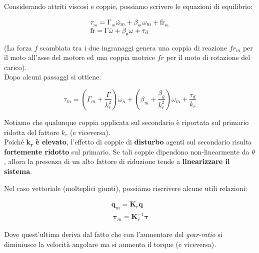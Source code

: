 Considerando attriti viscosi e coppie, possiamo scrivere le equazioni di equilibrio:

$$
\begin{array}{l c r}
	{\tau_{_\mathrm{m}}=\Gamma_{_\mathrm{m}}\dot{\omega}_{\mathrm{m}}+\beta_{_\mathrm{m}}\omega_{\mathrm{m}}+\mathrm{fr}_{_{\mathrm{m}}}}\\ {\mathrm{fr}=\Gamma\dot{\omega}+\beta_{_\mathrm{g}}\omega+\tau_{\mathrm{d}}}
\end{array}
$$

(La forza $f$ scambiata tra i due ingranaggi genera una coppia di reazione $fr_m$ per il moto all'asse del motore ed una coppia motrice $fr$ per il moto di rotazione del carico).\\
Dopo alcuni passaggi si ottiene:

$$
\tau_m = \left( \Gamma_m + \frac{\Gamma}{k_r^2} \right) \dot{\omega}_n
+
\left( \beta_m + \frac{\beta_g}{k_r^2} \right)\omega_m
+
\frac{\tau_d}{k_r}
$$

Notiamo che qualunque coppia applicata sul secondario è riportata sul primario ridotta del fattore $k_r$ (e viceversa). \\
Poiché $\mathbf{k_r}$ \textbf{è elevato}, l’effetto di coppie di \textbf{disturbo} agenti sul secondario risulta \textbf{fortemente ridotto} sul primario. Se tali coppie dipendono non-linearmente da $\theta$, allora la presenza di un alto fattore di riduzione tende a \textbf{linearizzare il sistema}.

Nel caso vettoriale (molteplici giunti), possiamo riscrivere alcune utili relazioni:

\begin{align}
	\mathbf{q}_m = \mathbf{K}_r\mathbf{q} \label{eq:trasmission_reduction}\\\
	\boldsymbol{\tau}_m = \mathbf{K}_r^{-1} \boldsymbol{\tau} \label{eq:trasmission_reduction_torque}
\end{align}

Dove quest'ultima deriva dal fatto che con l'aumentare del \textit{gear-ratio} si diminiusce la velocità angolare ma si aumenta il torque (e viceversa).




